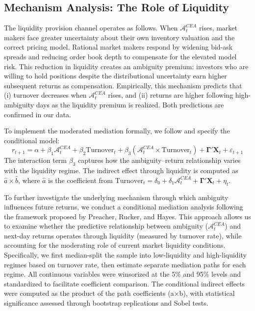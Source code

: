 \documentclass[preprint,12pt,authoryear]{elsarticle}
\renewcommand{\textcolor}[2]{\begingroup\color{#1}#2\endgroup}
\begin{document}
\subsection{Mechanism Analysis: The Role of Liquidity}
\textcolor{red}{The liquidity provision channel operates as follows. When $\mathcal{A}^{CEA}_t$ rises, market makers face greater uncertainty about their own inventory valuation and the correct pricing model. Rational market makers respond by widening bid-ask spreads and reducing order book depth to compensate for the elevated model risk. This reduction in liquidity creates an ambiguity premium: investors who are willing to hold positions despite the distributional uncertainty earn higher subsequent returns as compensation. Empirically, this mechanism predicts that (i) turnover decreases when $\mathcal{A}^{CEA}_t$ rises, and (ii) returns are higher following high-ambiguity days as the liquidity premium is realized. Both predictions are confirmed in our data.}

\textcolor{red}{To implement the moderated mediation formally, we follow \citet{preacher2007moderated} and specify the conditional model:
\begin{equation}
r_{t+1} = \alpha + \beta_1 \mathcal{A}^{CEA}_t + \beta_2 \text{Turnover}_t + \beta_3 (\mathcal{A}^{CEA}_t \times \text{Turnover}_t) + \mathbf{\Gamma}'\mathbf{X}_t + \varepsilon_{t+1}
\end{equation}
The interaction term $\beta_3$ captures how the ambiguity--return relationship varies with the liquidity regime. The indirect effect through liquidity is computed as $\hat{a} \times \hat{b}$, where $\hat{a}$ is the coefficient from $\text{Turnover}_t = \delta_0 + \delta_1 \mathcal{A}^{CEA}_t + \mathbf{\Gamma}'\mathbf{X}_t + \eta_t$.}

To further investigate the underlying mechanism through which ambiguity influences future returns, we conduct a conditional mediation analysis following the framework proposed by Preacher, Rucker, and Hayes\cite{preacher2007moderated}. This approach allows us to examine whether the predictive relationship between ambiguity ($\mathcal{A}^{CEA}_t$) and next-day returns operates through liquidity (measured by turnover rate), while accounting for the moderating role of current market liquidity conditions. Specifically, we first median-split the sample into low-liquidity and high-liquidity regimes based on turnover rate, then estimate separate mediation paths for each regime. All continuous variables were winsorized at the 5\% and 95\% levels and standardized to facilitate coefficient comparison. The conditional indirect effects were computed as the product of the path coefficients (a$\times$b), with statistical significance assessed through bootstrap replications and Sobel tests.
\end{document}
